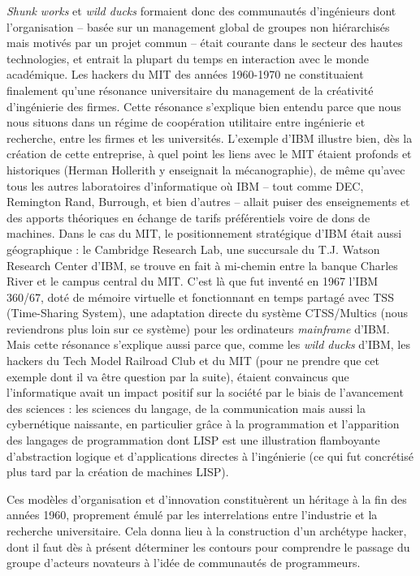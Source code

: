 \documentclass{FramateX}
\begin{document}
\begin{refsection}
\textit{Shunk works} et \textit{wild ducks} formaient donc des
communautés d'ingénieurs dont
l'organisation -- basée sur un management global de
groupes non hiérarchisés mais motivés par un projet commun -- était
courante dans le secteur des hautes technologies, et entrait la plupart
du temps en interaction avec le monde académique. Les hackers du MIT
des années 1960-1970 ne constituaient finalement
qu'une résonance universitaire du management de la
créativité d'ingénierie des firmes. Cette résonance
s'explique bien entendu parce que nous nous situons
dans un régime de coopération utilitaire entre ingénierie et recherche,
entre les firmes et les universités. L'exemple
d'IBM illustre bien, dès la création de cette
entreprise, à quel point les liens avec le MIT étaient profonds et
historiques (Herman Hollerith y enseignait la mécanographie), de même
qu'avec tous les autres laboratoires
d'informatique où IBM -- tout comme DEC, Remington
Rand, Burrough, et bien d'autres -- allait puiser
des enseignements et des apports théoriques en échange de tarifs
préférentiels voire de dons de machines. Dans le cas du MIT, le
positionnement stratégique d'IBM était aussi
géographique : le Cambridge Research Lab, une succursale du T.J. Watson
Research Center d'IBM, se trouve en fait à mi-chemin
entre la banque Charles River et le campus central du MIT.
C'est là que fut inventé en 1967
l'IBM 360/67, doté de mémoire virtuelle et
fonctionnant en temps partagé avec TSS (Time-Sharing System), une
adaptation directe du système CTSS/Multics (nous reviendrons plus loin
sur ce système) pour les ordinateurs \textit{mainframe}
d'IBM. Mais cette résonance
s'explique aussi parce que, comme les \textit{wild
ducks} d'IBM, les hackers du Tech Model Railroad Club
et du MIT (pour ne prendre que cet exemple dont il va être question par
la suite), étaient convaincus que l'informatique avait
un impact positif sur la société par le biais de
l'avancement des sciences : les sciences du langage,
de la communication mais aussi la cybernétique naissante, en
particulier grâce à la programmation et l'apparition
des langages de programmation dont LISP est une illustration
flamboyante d'abstraction logique et
d'applications directes à
l'ingénierie (ce qui fut concrétisé plus tard par la
création de machines LISP).

Ces modèles d'organisation et d'innovation constituèrent un héritage à
la fin des années 1960, proprement émulé par les interrelations entre
l'industrie et la recherche universitaire. Cela donna lieu à la
construction d'un archétype hacker, dont il faut dès à présent
déterminer les contours pour comprendre le passage du groupe d'acteurs
novateurs à l'idée de communautés de programmeurs.


\end{refsection}
\end{document}

